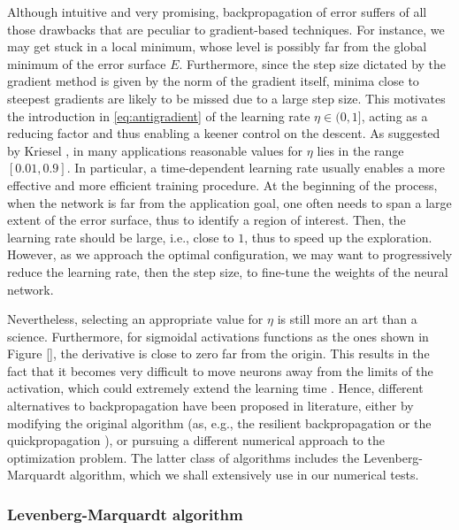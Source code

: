 \documentclass[12pt, a4paper, twoside, openright]{report}
\numberwithin{equation}{chapter}
\theoremstyle{theorem}
\theoremstyle{definition}
\theoremstyle{remark}
\theoremstyle{proposition}
\numberwithin{figure}{chapter}
\begin{document}
		Although intuitive and very promising, backpropagation of error suffers of all those drawbacks that are peculiar to gradient-based techniques. For instance, we may get stuck in a local minimum, whose level is possibly far from the global minimum of the error surface $E$. Furthermore, since the step size dictated by the gradient method is given by the norm of the gradient itself, minima close to steepest gradients are likely to be missed due to a large step size. This motivates the introduction in \eqref{eq:antigradient} of the learning rate $\eta \in (0,1]$, acting as a reducing factor and thus enabling a keener control on the descent. As suggested by Kriesel \cite{Kri}, in many applications reasonable values for $\eta$ lies in the range $[0.01,0.9]$. In particular, a time-dependent learning rate usually enables a more effective and more efficient training procedure. At the beginning of the process, when the network is far from the application goal, one often needs to span a large extent of the error surface, thus to identify a region of interest. Then, the learning rate should be large, i.e., close to $1$, thus to speed up the exploration. However, as we approach the optimal configuration, we may want to progressively reduce the learning rate, then the step size, to fine-tune the weights of the neural network. 
		
		Nevertheless, selecting an appropriate value for $\eta$ is still more an art than a science. Furthermore, for sigmoidal activations functions as the ones shown in Figure \ref{}, the derivative is close to zero far from the origin. This results in the fact that it becomes very difficult to move neurons away from the limits of the activation, which could extremely extend the learning time \cite{Kri}. Hence, different alternatives to backpropagation have been proposed in literature, either by modifying the original algorithm (as, e.g., the resilient backpropagation \cite{RB93} or the quickpropagation \cite{Fah88}), or pursuing a different numerical approach to the optimization problem. The latter class of algorithms includes the Levenberg-Marquardt algorithm, which we shall extensively use in our numerical tests.
				
		\subsubsection{Levenberg-Marquardt algorithm}
		\label{section:Levenberg-Marquardt algorithm}
		
\end{document}
